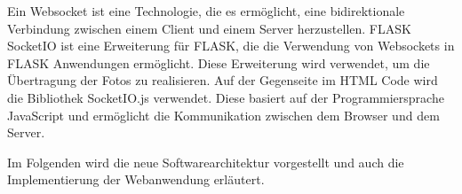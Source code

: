 Ein Websocket ist eine Technologie, die es ermöglicht, eine bidirektionale Verbindung zwischen einem Client und einem Server herzustellen.
FLASK SocketIO ist eine Erweiterung für FLASK, die die Verwendung von Websockets in FLASK Anwendungen ermöglicht. Diese Erweiterung wird verwendet, um die Übertragung der Fotos zu realisieren. 
Auf der Gegenseite im HTML Code wird die Bibliothek SocketIO.js verwendet. 
Diese basiert auf der Programmiersprache JavaScript und ermöglicht die Kommunikation zwischen dem Browser und dem Server.

Im Folgenden wird die neue Softwarearchitektur vorgestellt und auch die Implementierung der Webanwendung erläutert.